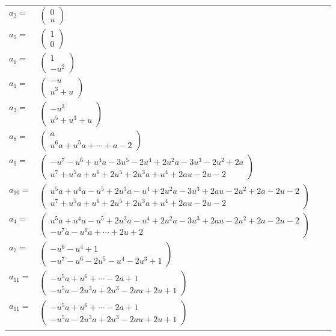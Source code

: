 \documentclass[1p]{elsarticle_modified}
\theoremstyle{definition}
\begin{document}
\begin{tabular}{m{7pt} m{180pt} m{7pt} m{180pt} }
\flushright $a_{2}=$&$\begin{pmatrix}0\\u\end{pmatrix}$ \\
\flushright $a_{5}=$&$\begin{pmatrix}1\\0\end{pmatrix}$ \\
\flushright $a_{6}=$&$\begin{pmatrix}1\\- u^2\end{pmatrix}$ \\
\flushright $a_{1}=$&$\begin{pmatrix}- u\\u^3+u\end{pmatrix}$ \\
\flushright $a_{3}=$&$\begin{pmatrix}- u^3\\u^5+u^3+u\end{pmatrix}$ \\
\flushright $a_{8}=$&$\begin{pmatrix}a\\u^6 a+u^5 a+\cdots+a-2\end{pmatrix}$ \\
\flushright $a_{9}=$&$\begin{pmatrix}- u^7- u^6+u^4 a-3 u^5-2 u^4+2 u^2 a-3 u^3-2 u^2+2 a\\u^7+u^5 a+u^6+2 u^5+2 u^3 a+u^4+2 a u-2 u-2\end{pmatrix}$ \\
\flushright $a_{10}=$&$\begin{pmatrix}u^5 a+u^4 a- u^5+2 u^3 a- u^4+2 u^2 a-3 u^3+2 a u-2 u^2+2 a-2 u-2\\u^7+u^5 a+u^6+2 u^5+2 u^3 a+u^4+2 a u-2 u-2\end{pmatrix}$ \\
\flushright $a_{4}=$&$\begin{pmatrix}u^5 a+u^4 a- u^5+2 u^3 a- u^4+2 u^2 a-3 u^3+2 a u-2 u^2+2 a-2 u-2\\- u^7 a- u^6 a+\cdots+2 u+2\end{pmatrix}$ \\
\flushright $a_{7}=$&$\begin{pmatrix}- u^6- u^4+1\\- u^7- u^6-2 u^5- u^4-2 u^3+1\end{pmatrix}$ \\
\flushright $a_{11}=$&$\begin{pmatrix}- u^5 a+u^6+\cdots-2 a+1\\- u^5 a-2 u^3 a+2 u^3-2 a u+2 u+1\end{pmatrix}$\\ \flushright $a_{11}=$&$\begin{pmatrix}- u^5 a+u^6+\cdots-2 a+1\\- u^5 a-2 u^3 a+2 u^3-2 a u+2 u+1\end{pmatrix}$\\&\end{tabular}
\end{document}
